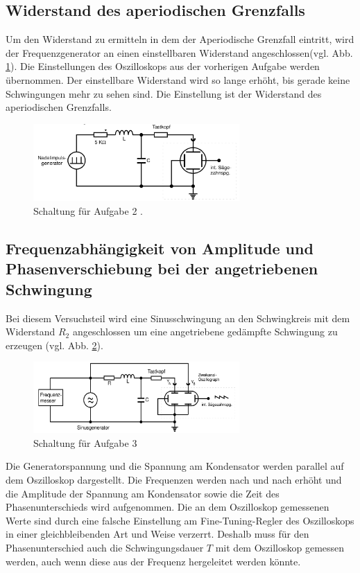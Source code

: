 \subsection{Widerstand des aperiodischen Grenzfalls}
Um den Widerstand zu ermitteln in dem der Aperiodische Grenzfall eintritt,
wird der Frequenzgenerator an einen einstellbaren Widerstand angeschlossen(vgl. Abb. \ref{fig:Schaltung_b}).
Die Einstellungen des Oszilloskops aus der vorherigen Aufgabe werden übernommen.
Der einstellbare Widerstand wird so lange erhöht, bis gerade keine Schwingungen mehr zu sehen sind.
Die Einstellung ist der Widerstand des aperiodischen Grenzfalls.
\begin{figure}
    \centering
    \includegraphics[width=0.7\textwidth]{Abbildungen/Schaltung_b.png}
    \caption{Schaltung für Aufgabe 2 \cite{man:v354}.}
    \label{fig:Schaltung_b}
\end{figure}


\subsection{Frequenzabhängigkeit von Amplitude und Phasenverschiebung bei der angetriebenen Schwingung}
Bei diesem Versuchsteil wird eine Sinusschwingung an den Schwingkreis mit dem
Widerstand $R_2$ angeschlossen um eine angetriebene gedämpfte Schwingung zu erzeugen (vgl. Abb. \ref{fig:Schaltung_c}).
\begin{figure}
    \centering
    \includegraphics[width=0.7\textwidth]{Abbildungen/Schaltung_c.png}
    \caption{Schaltung für Aufgabe 3 \cite{man:v354}}
    \label{fig:Schaltung_c}
\end{figure}
Die Generatorspannung und die Spannung am Kondensator werden parallel auf dem Oszilloskop dargestellt.
Die Frequenzen werden nach und nach erhöht und die Amplitude der Spannung am Kondensator
sowie die Zeit des Phasenunterschieds wird aufgenommen.
Die an dem Oszilloskop gemessenen Werte sind durch eine falsche Einstellung am Fine-Tuning-Regler des Oszilloskops
in einer gleichbleibenden Art und Weise verzerrt.
Deshalb muss für den Phasenunterschied auch die Schwingungsdauer $T$ mit dem Oszilloskop gemessen werden, 
auch wenn diese aus der Frequenz hergeleitet werden könnte.